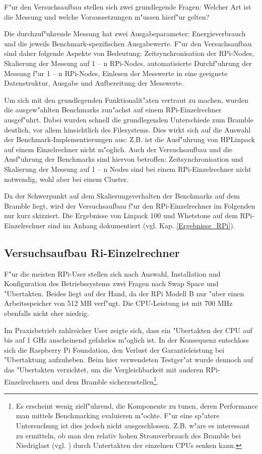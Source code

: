 F"ur den Versuchsaufbau stellen sich zwei grundlegende Fragen: Welcher Art ist die Messung und welche Voraussetzungen m"ussen hierf"ur gelten? 

Die durchzuf"uhrende Messung hat zwei Ausgabeparameter: Energieverbrauch und die jeweils Benchmark-spezifischen Ausgabewerte. F"ur den Versuchsaufbau sind daher folgende Aspekte von Bedeutung: Zeitsynchronisation der RPi-Nodes, Skalierung der Messung auf 1 -- n RPi-Nodes, automatisierte Durchf"uhrung der Messung f"ur 1 -- n RPi-Nodes, Einlesen der Messwerte in eine geeignete Datenstruktur, Ausgabe und Aufbereitung der Messwerte. 

Um sich mit den grundlegenden Funktionalit"aten vertraut zu machen, wurden die ausgew"ahlten Benchmarks zun"achst auf einem RPi-Einzelrechner ausgef"uhrt. Dabei wurden schnell die grundlegenden Unterschiede zum Bramble deutlich, vor allem hinsichtlich des Filesystems. Dies wirkt sich auf die Auswahl der Benchmark-Implementierungen aus: Z.B. ist die Ausf"uhrung von HPLinpack auf einem Einzelrechner nicht m"oglich. Auch der Versuchsaufbau und die Ausf"uhrung der Benchmarks sind hiervon betroffen: Zeitsynchronisation und Skalierung der Messung auf 1 -- n Nodes sind bei einem RPi-Einzelrechner nicht notwendig, wohl aber bei einem Cluster. 

Da der Schwerpunkt auf dem Skalierungsverhalten der Benchmarks auf dem Bramble liegt, wird der Versuchsaufbau f"ur den RPi-Einzelrechner im Folgenden nur kurz skizziert. Die Ergebnisse von Linpack 100 und Whetstone auf dem RPi-Einzelrechner sind im Anhang dokumentiert (vgl. Kap. \ref{Ergebnisse_RPi}).  

\subsection{Versuchsaufbau Ri-Einzelrechner}\label{RPi-Versuchsaufbau}

F"ur die meisten RPi-User stellen sich nach Auswahl, Installation und Konfiguration des Betriebssystems zwei Fragen nach Swap Space und "Ubertakten. Beides liegt auf der Hand, da der RPi Modell B nur "uber einen Arbeitsspeicher von 512 MB verf"ugt. Die CPU-Leistung ist mit 700 MHz ebenfalls nicht eher niedrig. 

Im Praxisbetrieb zahlreicher User zeigte sich, dass ein "Ubertakten der CPU auf bis auf 1 GHz anscheinend gefahrlos m"oglich ist. In der Konsequenz entschloss sich die Raspberry Pi Foundation, den Verlust der Garantieleistung bei "Ubertaktung aufzuheben. Beim hier verwendeten Testger"at wurde dennoch auf das "Ubertakten verzichtet, um die Vergleichbarkeit mit anderen RPi-Einzelrechnern und dem Bramble sicherzustellen\footnote{Es erscheint wenig zielf"uhrend, die Komponente zu tunen, deren Performance man mittels Benchmarking evaluieren m"ochte. F"ur eine sp"atere Untersuchung ist dies jedoch nicht ausgeschlossen. Z.B. w"are es interessant zu ermitteln, ob man den relativ hohen Stromverbrauch des Bramble bei Niedriglast (vgl. \cite{kli13}) durch Untertakten der einzelnen CPUs senken kann.}.

